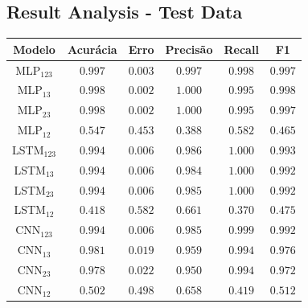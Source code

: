 \documentclass[a4paper,fleqn]{cas-sc}
\begin{document}
\subsection{Result Analysis - Test Data}\label{sec:analysis_training}
\hfill
\begin{minipage}{0.45\textwidth}
	\begingroup
	\begin{tiny}	
		\setlength{\tabcolsep}{3pt}
		\renewcommand{\arraystretch}{1.15}
		
		
		\begin{tabular*}{\textwidth}{@{} CCCCCC@{} }
			\toprule
			Modelo&Acurácia&Erro&Precisão&Recall&F1 \\
			\midrule
			MLP$_{123}$ & $0.997$ & $0.003$ & $0.997$ & $0.998$ & $0.997$ \\
			MLP$_{13}$ & $0.998$ & $0.002$ & $1.000$ & $0.995$ & $0.998$ \\
			MLP$_{23}$ & $0.998$ & $0.002$ & $1.000$ & $0.995$ & $0.997$ \\
			MLP$_{12}$ & $0.547$ & $0.453$ & $0.388$ & $0.582$ & $0.465$ \\
			LSTM$_{123}$ & $0.994$ & $0.006$ & $0.986$ & $1.000$ & $0.993$ \\
			LSTM$_{13}$ & $0.994$ & $0.006$ & $0.984$ & $1.000$ & $0.992$ \\
			LSTM$_{23}$ & $0.994$ & $0.006$ & $0.985$ & $1.000$ & $0.992$ \\
			LSTM$_{12}$ & $0.418$ & $0.582$ & $0.661$ & $0.370$ & $0.475$ \\
			CNN$_{123}$ & $0.994$ & $0.006$ & $0.985$ & $0.999$ & $0.992$ \\
			CNN$_{13}$ & $0.981$ & $0.019$ & $0.959$ & $0.994$ & $0.976$ \\
			CNN$_{23}$ & $0.978$ & $0.022$ & $0.950$ & $0.994$ & $0.972$ \\
			CNN$_{12}$ & $0.502$ & $0.498$ & $0.658$ & $0.419$ & $0.512$ \\    		
			\bottomrule
		\end{tabular*}
		\vspace{-0.3cm}
		\label{tab:metricas_10Mbps_teste}
	\end{tiny}
	\endgroup
\end{minipage}
\hfill
\end{document}
